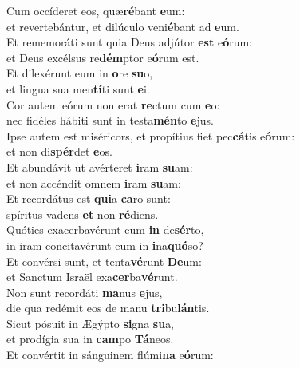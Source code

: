 \evenverse Cum occíderet eos, quæ\textbf{ré}bant \textbf{e}um:~\*\\
\evenverse et revertebántur, et dilúculo veni\textbf{é}bant ad \textbf{e}um.\\
\oddverse Et rememoráti sunt quia Deus adjútor \textbf{est} e\textbf{ó}rum:~\*\\
\oddverse et Deus excélsus re\textbf{dém}ptor e\textbf{ó}rum est.\\
\evenverse Et dilexérunt eum in \textbf{o}re \textbf{su}o,~\*\\
\evenverse et lingua sua men\textbf{tí}ti sunt \textbf{e}i.\\
\oddverse Cor autem eórum non erat \textbf{re}ctum cum \textbf{e}o:~\*\\
\oddverse nec fidéles hábiti sunt in testa\textbf{mén}to \textbf{e}jus.\\
\evenverse Ipse autem est miséricors, et propítius fiet pec\textbf{cá}tis e\textbf{ó}rum:~\*\\
\evenverse et non di\textbf{spér}det \textbf{e}os.\\
\oddverse Et abundávit ut avérteret \textbf{i}ram \textbf{su}am:~\*\\
\oddverse et non accéndit omnem \textbf{i}ram \textbf{su}am:\\
\evenverse Et recordátus est \textbf{qui}a \textbf{ca}ro sunt:~\*\\
\evenverse spíritus vadens \textbf{et} non \textbf{ré}diens.\\
\oddverse Quóties exacerbavérunt eum \textbf{in} de\textbf{sér}to,~\*\\
\oddverse in iram concitavérunt eum in \textbf{i}na\textbf{quó}so?\\
\evenverse Et convérsi sunt, et tenta\textbf{vé}runt \textbf{De}um:~\*\\
\evenverse et Sanctum Israël exa\textbf{cer}ba\textbf{vé}runt.\\
\oddverse Non sunt recordáti \textbf{ma}nus \textbf{e}jus,~\*\\
\oddverse die qua redémit eos de manu \textbf{tri}bu\textbf{lán}tis.\\
\evenverse Sicut pósuit in Ægýpto \textbf{si}gna \textbf{su}a,~\*\\
\evenverse et prodígia sua in \textbf{cam}po \textbf{Tá}neos.\\
\oddverse Et convértit in sánguinem flúmi\textbf{na} e\textbf{ó}rum:~\*\\
